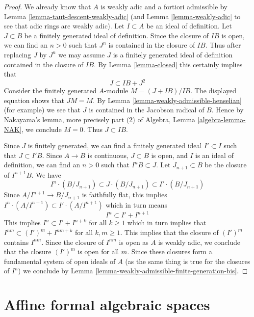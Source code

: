 \begin{proof}
We already know that $A$ is weakly adic and a fortiori admissible by
Lemma \ref{lemma-taut-descent-weakly-adic} (and Lemma \ref{lemma-weakly-adic}
to see that adic rings are weakly adic).
Let $I \subset A$ be an ideal of definition.
Let $J \subset B$ be a finitely generated ideal of definition.
Since the closure of $IB$ is open, we can find an $n > 0$ such that
$J^n$ is contained in the closure of $IB$. Thus after replacing $J$
by $J^n$ we may assume $J$ is a finitely generated ideal
of definition contained in the closure of $IB$. By Lemma \ref{lemma-closed}
this certainly implies that
$$
J \subset IB + J^2
$$
Consider the finitely generated $A$-module $M = (J + IB)/IB$.
The displayed equation shows that $JM = M$.
By Lemma \ref{lemma-weakly-admissible-henselian} (for example)
we see that $J$ is contained in the Jacobson radical of $B$.
Hence by Nakayama's lemma, more precisely part (2) of
Algebra, Lemma \ref{algebra-lemma-NAK}, we conclude $M = 0$.
Thus $J \subset IB$.

\medskip\noindent
Since $J$ is finitely generated, we can find a finitely generated
ideal $I' \subset I$ such that $J \subset I'B$.
Since $A \to B$ is continuous, $J \subset B$ is open, and
$I$ is an ideal of definition, we can find an $n > 0$ such that
$I^nB \subset J$. Let $J_{n + 1} \subset B$ be the closure of
$I^{n + 1}B$.
We have
$$
I^n \cdot (B/J_{n + 1}) \subset J \cdot (B/J_{n + 1}) \subset
I' \cdot (B/J_{n + 1})
$$
Since $A/I^{n + 1} \to B/J_{n + 1}$ is faithfully flat, this
implies $I^n \cdot (A/I^{n + 1}) \subset I' \cdot (A/I^{n + 1})$
which in turn means
$$
I^n \subset I' + I^{n + 1}
$$
This implies $I^n \subset I'  + I^{n + k}$ for all $k \geq 1$
which in turn implies that $I^{nm} \subset (I')^m + I^{nm + k}$
for all $k, m \geq 1$. This implies that the closure of
$(I')^m$ contains $I^{nm}$. Since the closure of $I^{nm}$ is open
as $A$ is weakly adic,
we conclude that the closure $(I')^m$ is open for all $m$.
Since these closures form a fundamental system of open ideals
of $A$ (as the same thing is true for the closures of $I^n$)
we conclude by Lemma \ref{lemma-weakly-admissible-finite-generation-bis}.
\end{proof}









\section{Affine formal algebraic spaces}
\label{section-affine-formal-algebraic-spaces}

